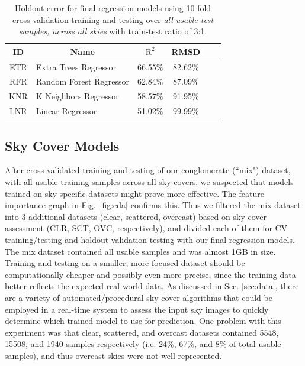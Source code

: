 \begin{table}[hbtp]
\caption[holdout]{Holdout error for final regression models using 10-fold cross validation training and testing over \textit{all usable test samples, across all skies} with train-test ratio of 3:1.\protect\footnotemark}
\label{tab:modelerror}
\centering      
\begin{tabular}{cl*{4}{c}}
    \\
    \toprule
    ID & \multicolumn{1}{c}{Name} & $\mathrm{R}^2$ & RMSD\\
    \midrule
    \rule[-1ex]{0pt}{3.5ex}  ETR & Extra Trees Regressor & 66.55\% & 82.62\% \\
    \rule[-1ex]{0pt}{3.5ex}  RFR & Random Forest Regressor & 62.84\% & 87.09\% \\
    \rule[-1ex]{0pt}{3.5ex}  KNR & K Neighbors Regressor & 58.57\% & 91.95\% \\
    \rule[-1ex]{0pt}{3.5ex}  LNR & Linear Regressor & 51.02\% & 99.99\% \\
    \bottomrule
\end{tabular}
\end{table}


\subsection{Sky Cover Models}
\label{sec:skycover}

After cross-validated training and testing of our conglomerate (``mix") dataset, with all usable training samples across all sky covers, we suspected that models trained on sky specific datasets might prove more effective. The feature importance graph in Fig.~\ref{fig:eda} confirms this. Thus we filtered the mix dataset into 3 additional datasets (clear, scattered, overcast) based on sky cover assessment (CLR, SCT, OVC, respectively), and divided each of them for CV training/testing and holdout validation testing with our final regression models. The mix dataset contained all usable samples and was almost 1GB in size. Training and testing on a smaller, more focused dataset should be computationally cheaper and possibly even more precise, since the training data better reflects the expected real-world data. As discussed in Sec. \ref{sec:data}, there are a variety of automated/procedural sky cover algorithms that could be employed in a real-time system to assess the input sky images to quickly determine which trained model to use for prediction.  One problem with this experiment was that clear, scattered, and overcast datasets contained 5548, 15508, and 1940 samples respectively (i.e. 24\%, 67\%, and 8\% of total usable samples), and thus overcast skies were not well represented.

